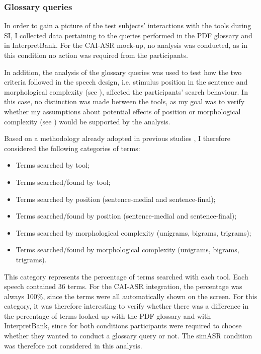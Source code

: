\subsubsection{Glossary queries} \label{queries}
In order to gain a picture of the test subjects' interactions with the tools during SI, I collected data pertaining to the queries performed in the PDF glossary and in InterpretBank. For the CAI-ASR mock-up, no analysis was conducted, as in this condition no action was required from the participants.

In addition, the analysis of the glossary queries was used to test how the two criteria followed in the speech design, i.e. stimulus position in the sentence and morphological complexity (see ), affected the participants' search behaviour. In this case, no distinction was made between the tools, as my goal was to verify whether my assumptions about potential effects of position or morphological complexity (see ) would be supported by the analysis.

Based on a methodology already adopted in previous studies \citep{prandi_uso_2015, prandi_use_2015, prandi_designing_2017, prandi_exploratory_2018}, I therefore considered the following categories of terms:

\begin{itemize}
    \sloppy
    \item Terms searched by tool;
    \item Terms searched/found by tool;
    \item Terms searched by position (sentence-medial and sentence-final);
    \item Terms searched/found by position (sentence-medial and sentence-final);
    \item Terms searched by morphological complexity (unigrams, bigrams, trigrams);
    \item Terms searched/found by morphological complexity (unigrams, bigrams, trigrams).
\end{itemize}

 \label{terms_searched}
This category represents the percentage of terms searched with each tool. Each speech contained 36 terms. For the CAI-ASR integration, the percentage was always 100\%, since the terms were all automatically shown on the screen. For this category, it was therefore interesting to verify whether there was a difference in the percentage of terms looked up with the PDF glossary and with InterpretBank, since for both conditions participants were required to choose whether they wanted to conduct a glossary query or not. The simASR condition was therefore not considered in this analysis.

